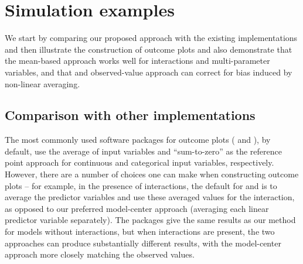 \section{Simulation examples}

We start by comparing our proposed approach with the existing implementations and then illustrate the construction of outcome plots and also demonstrate that the mean-based approach works well for interactions and multi-parameter variables, and that and observed-value approach can correct for bias induced by non-linear averaging.

\subsection{Comparison with other implementations}

The most commonly used  software packages for outcome plots ( and ), by default, use the average of input variables and ``sum-to-zero'' as the reference point approach for continuous and categorical input variables, respectively. However, there are a number of choices one can make when constructing outcome plots -- for example, in the presence of interactions, the default for  and  is to average the predictor variables and use these averaged values for the interaction, as opposed to our preferred model-center approach (averaging each linear predictor variable separately). The packages give the same results as our method for models without interactions, but when interactions are present, the two approaches can produce substantially different results, with the model-center approach more closely matching the observed values. 


